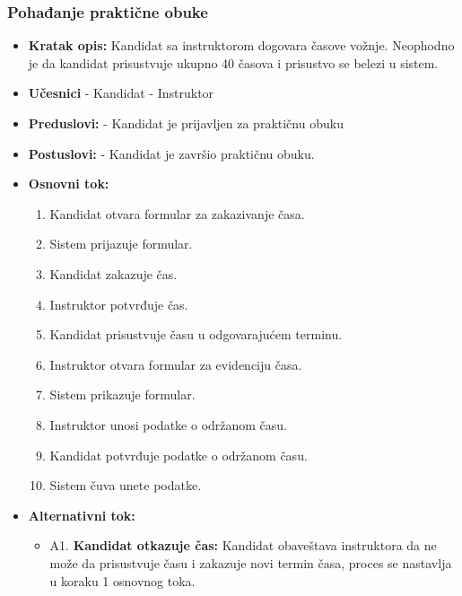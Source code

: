 \subsubsection{Pohađanje praktične obuke}

\vspace{3mm}

\begin{itemize}

\item \textbf{Kratak opis:} Kandidat sa instruktorom dogovara časove vožnje. Neophodno je da kandidat prisustvuje ukupno 40 časova i prisustvo se belezi u sistem.

\vspace{2mm}

\item \textbf{Učesnici} \newline
   - Kandidat \newline   
   - Instruktor 
   
\item \textbf{Preduslovi:} \newline
   - Kandidat je prijavljen za praktičnu obuku 

\item \textbf{Postuslovi:} \newline
    - Kandidat je završio praktičnu obuku.

\item \textbf{Osnovni tok:}  
   \begin{enumerate}
   \item Kandidat otvara formular za zakazivanje časa.
   \item Sistem prijazuje formular.
   \item Kandidat zakazuje čas.
   \item Instruktor potvrđuje čas.
   \item Kandidat prisustvuje času u odgovarajućem terminu.
   \item Instruktor otvara formular za evidenciju časa.
   \item Sistem prikazuje formular.
   \item Instruktor unosi podatke o održanom času.
   \item Kandidat potvrđuje podatke o održanom času.
   \item Sistem čuva unete podatke. \newline
   \end{enumerate}

\item \textbf{Alternativni tok:}  
   \begin{itemize}
   \item A1. \textbf{Kandidat otkazuje čas:}
  Kandidat obaveštava instruktora da ne može da prisustvuje času i zakazuje novi termin časa, proces se nastavlja u koraku 1 osnovnog toka.
   \end{itemize}


\end{itemize}
